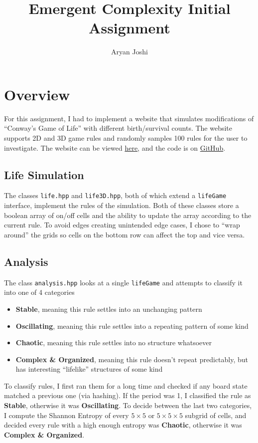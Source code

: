\documentclass{article}
\begin{document}
\title{Emergent Complexity Initial Assignment}
\author{Aryan Joshi}
\maketitle

\section{Overview}
For this assignment, I had to implement a website that simulates modifications of ``Conway's Game of Life'' with different birth/survival counts. The website supports 2D and 3D game rules and randomly samples 100 rules for the user to investigate. The website can be viewed \href{https://yoshijoshi21.github.io/Game-of-Life-3D/}{here}, and the code is on \href{https://github.com/YoshiJoshi21/Game-of-Life-3D}{GitHub}.
\subsection{Life Simulation}
The classes \verb|life.hpp| and \verb|life3D.hpp|, both of which extend a \verb|lifeGame| interface, implement the rules of the simulation. Both of these classes store a boolean array of on/off cells and the ability to update the array according to the current rule. To avoid edges creating unintended edge cases, I chose to ``wrap around'' the grids so cells on the bottom row can affect the top and vice versa.
\subsection{Analysis}
The class \verb|analysis.hpp| looks at a single \verb|lifeGame| and attempts to classify it into one of 4 categories
\begin{itemize}
    \item \textbf{Stable}, meaning this rule settles into an unchanging pattern
    \item \textbf{Oscillating}, meaning this rule settles into a repeating pattern of some kind
    \item \textbf{Chaotic}, meaning this rule settles into no structure whatsoever
    \item \textbf{Complex \& Organized}, meaning this rule doesn't repeat predictably, but has interesting ``lifelike'' structures of some kind
\end{itemize}
To classify rules, I first ran them for a long time and checked if any board state matched a previous one (via hashing). If the period was 1, I classified the rule as \textbf{Stable}, otherwise it was \textbf{Oscillating}. To decide between the last two categories, I compute the Shannon Entropy of every $5 \times 5$ or $5 \times 5 \times 5$ subgrid of cells, and decided every rule with a high enough entropy was \textbf{Chaotic}, otherwise it was \textbf{Complex \& Organized}.
\end{document}
